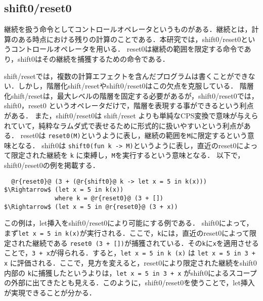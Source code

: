 \documentclass[10pt,a4j,xcolor=dvipsnames,twocolumn]{jarticle}
\theoremstyle{definition}
\begin{document}
\subsection{shift0/reset0}
継続を扱う命令としてコントロールオペレータというものがある．継続とは，計算のある時点における残りの計算のことである．本研究では，shift0/reset0というコントロールオペレータを用いる．
reset0は継続の範囲を限定する命令であり，shift0はその継続を捕獲するための命令である．

shift/reset\cite{Danvy1990}では，複数の計算エフェクトを含んだプログラムは書くことができない．しかし，階層化shift/resetやshift0/reset0はこの欠点を克服している．
階層化shift/reset\cite{Danvy1990}は，最大レベルの階層を固定する必要があるが，shift0/reset0では，shift0，reset0 というオペレータだけで，階層を表現する事ができるという利点がある．
また，shift0/reset0は shift/reset よりも単純なCPS変換で意味が与えられていて，純粋なラムダ式で表せるために形式的に扱いやすいという利点がある．
reset0は \lstinline|reset0(M)|というように表し，継続の範囲を\lstinline|M|に限定するという意味となる．
shift0は \lstinline|shift0(fun k -> M)|というように表し，直近のreset0によって限定された継続を \lstinline|k| に束縛し，\lstinline|M|を実行するという意味となる．
以下で，shift0/reset0の例を掲載する．



\begin{lstlisting}
  @r{reset0}@ (3 + (@r{shift0}@ k -> let x = 5 in k(x)))
$\Rightarrow$ (let x = 5 in k(x))
              where k = @r{reset0}@ (3 + [])
$\Rightarrow$ (let x = 5 in @r{reset0}@ (3 + x))
\end{lstlisting}
この例は，let挿入をshift0/reset0により可能にする例である．
shift0によって，まず\lstinline|let x = 5 in k(x)|が実行される．ここで，\lstinline|k|には，直近のreset0によって限定された継続である \lstinline|reset0 (3 + [])|が捕獲されている．その\lstinline|k|に\lstinline|x|を適用させることで，\lstinline|3 + x|が得られる．すると，\lstinline|let x = 5 in k (x)| は \lstinline|let x = 5 in 3 + x| に評価される．ここで，見方を変えると，reset0により限定された継続をshift0内部の \lstinline|k|に捕獲したというよりは，\lstinline|let x = 5 in 3 + x| がshift0によるスコープの外部に出てきたとも見える．このように，shift0/reset0を使うことで，let挿入が実現できることが分かる．
\end{document}

